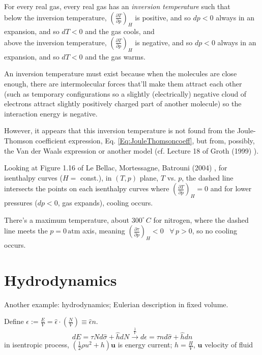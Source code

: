 \documentclass[10pt]{amsart}
\begin{document}
\begin{multicols*}{2}
For every real gas, every real gas has an \emph{inversion temperature} such that \\
below the inversion temperature, $\left( \frac{ \partial T}{ \partial p} \right)_H$ is positive, and so $dp <0$ always in an expansion, and so $dT <0$ and the gas cools, and \\
above the inversion temperature, $\left( \frac{ \partial T}{ \partial p} \right)_H$ is negative, and so $dp <0$ always in an expansion, and so $dT <0$ and the gas warms.  

An inversion temperature must exist because when the molecules are close enough, there are intermolecular forces that'll make them attract each other (such as temporary configurations so a slightly (electrically) negative cloud of electrons attract slightly positively charged part of another molecule) so the interaction energy is negative.  

However, it appears that this inversion temperature is not found from the Joule-Thomson coefficient expression, Eq. \ref{Eq:JouleThomsoncoeff}, but from, possibly, the Van der Waals expression or another model (cf. Lecture 18 of Groth (1999) \cite{EGroth1999}).  

Looking at Figure 1.16 of  Le Bellac, Mortessagne, Batrouni (2004) \cite{MLeBellacFMortessagneGBatrouni2004}, for isenthalpy curves ($H=$ const.), in $(T,p)$ plane, $T$ vs. $p$, the dashed line intersects the points on each isenthalpy curves where $\left( \frac{ \partial T}{ \partial p } \right)_H =0$ and for lower pressures ($dp<0$, gas expands), cooling occurs.  

There's a maximum temperature, about $300^{\circ} \, C$ for nitrogen, where the dashed line meets the $p=0 \, \text{atm}$ axis, meaning $\left( \frac{ \partial \tau}{ \partial p} \right)_H <0$ \, $\forall \, p >0$, so no cooling occurs.  

\section{Hydrodynamics}

Another example: hydrodynamics; Eulerian description in fixed volume.  

Define $\epsilon := \frac{ E}{V} = \widehat{\epsilon} \cdot \left( \frac{N}{V} \right) \equiv \widehat{\epsilon} n$.  
\[
dE = \tau N d\widehat{\sigma} + \widehat{h} dN \xrightarrow{ \frac{1}{V} } d\epsilon = \tau n d\widehat{\sigma} + \widehat{h} dn 
\]
in isentropic process, $\left( \frac{1}{2} \rho u^2 + h \right) \mathbf{u}$ is energy current; $h= \frac{H}{V}$, $\mathbf{u}$ velocity of fluid





\end{multicols*}
\end{document}
